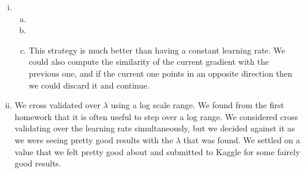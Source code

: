 \documentclass[paper=a4, fontsize=11pt]{scrartcl} %
\numberwithin{equation}{section} %
\numberwithin{figure}{section} %
\numberwithin{table}{section} %
\begin{document}
\begin{enumerate}[(i)]
\item
\begin{enumerate}[(a)]
Now the learning rate is propotional to 1/t.
\item
\item
\item

This strategy is much better than having a constant learning rate. We could also compute the similarity of the current gradient with the previous one, and if the current one points in an opposite direction then we could discard it and continue.

\end{enumerate}

\item
We cross validated over $\lambda$ using a log scale range. We found from the first homework that it is often useful to step over a log range. We considered cross validating over the learning rate simultaneously, but we decided against it as we were seeing pretty good results with the $\lambda$ that was found. We settled on a value that we felt pretty good about and submitted to Kaggle for some fairely good results.

\end{enumerate}
\end{document}
